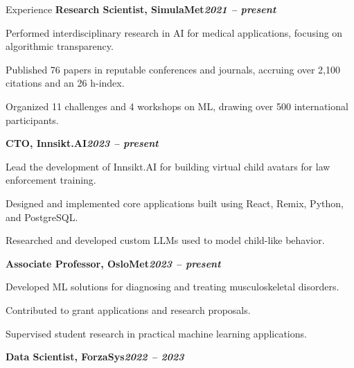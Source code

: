 \begin{rubric}{Experience}
%
\entry*[]%
\textbf{Research Scientist, SimulaMet\hfill\textit{2021 -- present}} \par
\begin{compactitem}
    \item Performed interdisciplinary research in AI for medical applications, focusing on algorithmic transparency.
    \item Published 76 papers in reputable conferences and journals, accruing over 2,100 citations and an 26 h-index.
    \item Organized 11 challenges and 4 workshops on ML, drawing over 500 international participants.
    \vspace{-12pt}
\end{compactitem}
%
\entry*[]%
\textbf{CTO, Innsikt.AI\hfill\textit{2023 -- present}} \par
\begin{compactitem}
    \item Lead the development of Innsikt.AI for building virtual child avatars for law enforcement training.
    \item Designed and implemented core applications built using React, Remix, Python, and PostgreSQL.
    \item Researched and developed custom LLMs used to model child-like behavior.
    \vspace{-12pt}
\end{compactitem}
%
\entry*[]%
\textbf{Associate Professor, OsloMet\hfill\textit{2023 -- present}} \par
\begin{compactitem}
    \item Developed ML solutions for diagnosing and treating musculoskeletal disorders.
    \item Contributed to grant applications and research proposals.
    \item Supervised student research in practical machine learning applications.
    \vspace{-12pt}
\end{compactitem}
%
\entry*[]%
\textbf{Data Scientist, ForzaSys\hfill\textit{2022 -- 2023}} \par
\begin{compactitem}

\end{compactitem}
\end{rubric}
